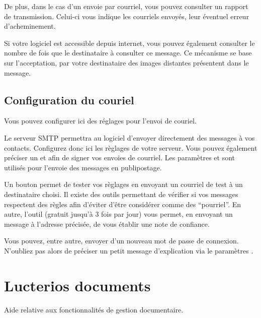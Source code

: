 \documentclass[letterpaper,10pt,french]{sphinxmanual}
\begin{document}
De plus, dans le cas d’un envoie par courriel, vous pouvez consulter un rapport de transmission.
Celui-ci vous indique les courriels envoyés, leur éventuel erreur d’acheminement.

Si votre logiciel est accessible depuis internet, vous pouvez également consulter le nombre de fois que le destinataire à consulter ce message.
Ce mécanisme se base sur l’acceptation, par votre destinataire des images distantes présentent dans le message.

\noindent{}


\section{Configuration du couriel}
\label{\detokenize{mailing/configuration:configuration-du-couriel}}\label{\detokenize{mailing/configuration::doc}}
Vous pouvez configurer ici des réglages pour l’envoi de couriel.

Le serveur SMTP permettra au logiciel d’envoyer directement des messages à vos contacts.
Configurez donc ici les règlages de votre serveur.
Vous pouvez également préciser un  et  afin de signer vos envoies de courriel.
Les paramètres  et  sont utilisés pour l’envoie des messages en publipostage.

Un bouton  permet de tester vos règlages en envoyant un courriel de test à un destinataire choisi.
Il existe des outils permettant de vérifier si vos messages respectent des règles afin d’éviter d’être considérer comme des “pourriel”.
En autre, l’outil  (gratuit jusqu’à 3 fois par jour) vous permet, en envoyant un message à l’adresse précisée, de vous établir une note de confiance.

Vous pouvez, entre autre, envoyer d’un nouveau mot de passe de connexion.
N’oubliez pas alors de préciser un petit message d’explication via le paramètres .


\chapter{Lucterios documents}
\label{\detokenize{documents/index:lucterios-documents}}\label{\detokenize{documents/index::doc}}
Aide relative aux fonctionnalités de gestion documentaire.
\end{document}
